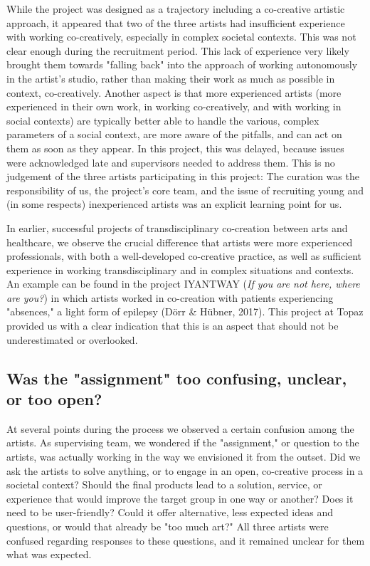 \documentclass[authordate, empirical,issue]{jote-new-article}
\begin{document}
{	While the project was designed as a trajectory including a co-creative artistic approach, it appeared that two of the three artists had insufficient experience with working co-creatively, especially in complex societal contexts. This was not clear enough during the recruitment period. This lack of experience very likely brought them towards "falling back" into the approach of working autonomously in the artist's studio, rather than making their work as much as possible in context, co-creatively. Another aspect is that more experienced artists (more experienced in their own work, in working co-creatively, and with working in social contexts) are typically better able to handle the various, complex parameters of a social context, are more aware of the pitfalls, and can act on them as soon as they appear. In this project, this was delayed, because issues were acknowledged late and supervisors needed to address them. This is no judgement of the three artists participating in this project: The curation was the responsibility of us, the project's core team, and the issue of recruiting young and (in some respects) inexperienced artists was an explicit learning point for us.

	

	

	In earlier, successful projects of transdisciplinary co-creation between arts and healthcare, we observe the crucial difference that artists were more experienced professionals, with both a well-developed co-creative practice, as well as sufficient experience in working transdisciplinary and in complex situations and contexts. An example can be found in the project IYANTWAY (\emph{If you are not here, where are you?}) in which artists worked in co-creation with patients experiencing "absences," a light form of epilepsy (Dörr \& Hübner, 2017). This project at Topaz provided us with a clear indication that this is an aspect that should not be underestimated or overlooked.


	

	\subsection{Was the "assignment" too confusing, unclear, or too open?}



	At several points during the process we observed a certain confusion among the artists. As supervising team, we wondered if the "assignment," or question to the artists, was actually working in the way we envisioned it from the outset. Did we ask the artists to solve anything, or to engage in an open, co-creative process in a societal context? Should the final products lead to a solution, service, or experience that would improve the target group in one way or another? Does it need to be user-friendly? Could it offer alternative, less expected ideas and questions, or would that already be "too much art?" All three artists were confused regarding responses to these questions, and it remained unclear for them what was expected.





}
\end{document}
